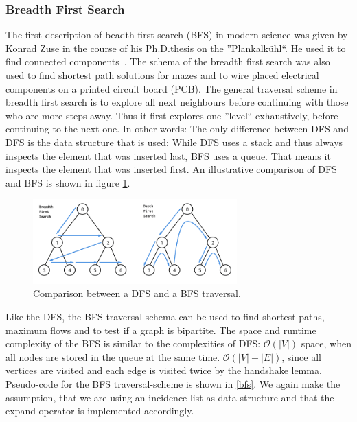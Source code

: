         \subsubsection*{Breadth First Search} 
        The first description of beadth first search (BFS) in modern science was given by Konrad Zuse in the course of his Ph.D.thesis on the ''Plankalkühl``. 
        He used it to find connected components~\autocite{zuse1948allgemeinen}. 
        The schema of the breadth first search was also used to find shortest path solutions for mazes and to wire placed electrical components on a printed circuit board (PCB).
        The general traversal scheme in breadth first search is to explore all next neighbours before continuing with those who are more steps away. 
        Thus it first explores one ''level`` exhaustively, before continuing to the next one. 
        In other words: The only difference between DFS and DFS is the data structure that is used: While DFS uses a stack and thus always inspects the element that was inserted last, BFS uses a queue.
        That means it inspects the element that was inserted first.
        An illustrative comparison of DFS and BFS is shown in figure \ref{dfs-bfs}. \\
        
        \begin{figure}
         \begin{center}
          \includegraphics[keepaspectratio,width=0.7\textwidth, height=0.3\textheight]{img/bfs-dfs.png}
         \end{center}
          \caption{Comparison between a DFS and a BFS traversal.}\label{dfs-bfs}
        \end{figure}
        
        Like the DFS, the BFS traversal schema can be used to find shortest paths, maximum flows and to test if a graph is bipartite. 
        The space and runtime complexity of the BFS is similar to the complexities of DFS: $\mathcal{O}(|V|)$ space, when all nodes are stored in the queue at the same time. 
        $\mathcal{O}(|V| + |E|)$, since all vertices are visited and each edge is visited twice by the handshake lemma. 
        Pseudo-code for the BFS traversal-scheme is shown in \ref{bfs}. 
        We again make the assumption, that we are using an incidence list as data structure and that the expand operator is implemented accordingly.

